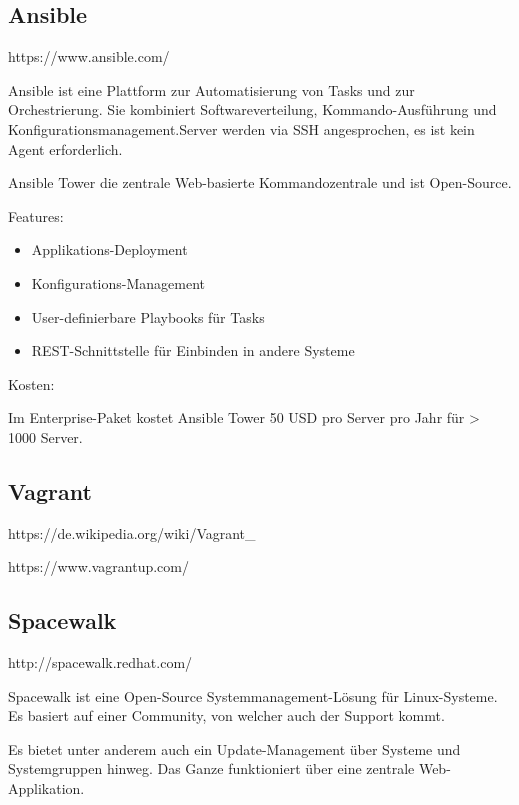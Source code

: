 \subsection{Ansible}

https://www.ansible.com/

Ansible ist eine Plattform zur Automatisierung von Tasks und zur Orchestrierung. Sie kombiniert Softwareverteilung, Kommando-Ausführung und Konfigurationsmanagement.Server werden via SSH angesprochen, es ist kein Agent erforderlich.

Ansible Tower die zentrale Web-basierte Kommandozentrale und ist Open-Source.


Features:
\begin{itemize}
\item Applikations-Deployment
\item Konfigurations-Management
\item User-definierbare Playbooks für Tasks
\item REST-Schnittstelle für Einbinden in andere Systeme
\end{itemize}

Kosten:

Im Enterprise-Paket kostet Ansible Tower 50 USD pro Server pro Jahr für > 1000 Server.


\subsection{Vagrant}

https://de.wikipedia.org/wiki/Vagrant_%

https://www.vagrantup.com/



\subsection{Spacewalk}

http://spacewalk.redhat.com/

Spacewalk ist eine Open-Source Systemmanagement-Lösung für Linux-Systeme. Es basiert auf einer Community, von welcher auch der Support kommt.

Es bietet unter anderem auch ein Update-Management über Systeme und Systemgruppen hinweg. Das Ganze funktioniert über eine zentrale Web-Applikation.

